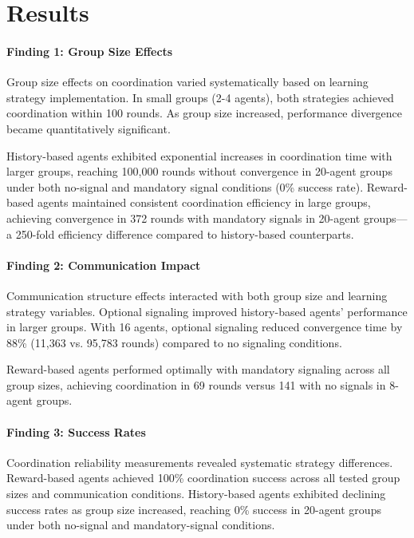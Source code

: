 \documentclass[12pt,a4paper]{article}
\begin{document}
\section{Results}

\paragraph{Finding 1: Group Size Effects} 
Group size effects on coordination varied systematically based on learning strategy implementation. In small groups (2-4 agents), both strategies achieved coordination within 100 rounds. As group size increased, performance divergence became quantitatively significant.

History-based agents exhibited exponential increases in coordination time with larger groups, reaching 100,000 rounds without convergence in 20-agent groups under both no-signal and mandatory signal conditions (0\% success rate). Reward-based agents maintained consistent coordination efficiency in large groups, achieving convergence in 372 rounds with mandatory signals in 20-agent groups—a 250-fold efficiency difference compared to history-based counterparts.

\paragraph{Finding 2: Communication Impact} 
Communication structure effects interacted with both group size and learning strategy variables. Optional signaling improved history-based agents' performance in larger groups. With 16 agents, optional signaling reduced convergence time by 88\% (11,363 vs. 95,783 rounds) compared to no signaling conditions.

Reward-based agents performed optimally with mandatory signaling across all group sizes, achieving coordination in 69 rounds versus 141 with no signals in 8-agent groups.

\paragraph{Finding 3: Success Rates} 
Coordination reliability measurements revealed systematic strategy differences. Reward-based agents achieved 100\% coordination success across all tested group sizes and communication conditions. History-based agents exhibited declining success rates as group size increased, reaching 0\% success in 20-agent groups under both no-signal and mandatory-signal conditions.
\end{document}
